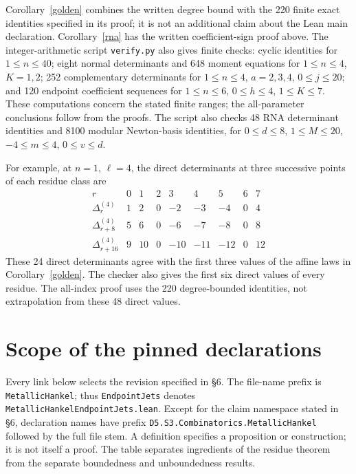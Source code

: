 \documentclass[11pt,a4paper]{article}
\newcommand{\D}[2]{\Delta_{#1}^{(#2)}}
\begin{document}
Corollary~\ref{golden} combines the written degree bound with the 220
finite exact identities specified in its proof; it is not an additional
claim about the Lean main declaration.
Corollary~\ref{rna} has the written coefficient-sign proof above.
The integer-arithmetic script \texttt{verify.py} also gives finite
checks: cyclic identities for $1\le n\le40$; eight normal determinants
and 648 moment equations for $1\le n\le4$, $K=1,2$; 252 complementary
determinants for $1\le n\le4$, $a=2,3,4$, $0\le j\le20$; and 120
endpoint coefficient sequences for $1\le n\le6$, $0\le h\le4$,
$1\le K\le7$. These computations concern the stated finite ranges;
the all-parameter conclusions follow from the proofs.
The script also checks 48 RNA determinant identities and 8100 modular
Newton-basis identities, for $0\le d\le8$, $1\le M\le20$,
$-4\le m\le4$, $0\le v\le d$.

For example, at $n=1$, $\ell=4$, the direct determinants at three
successive points of each residue class are
\[
\begin{array}{c|rrrrrrrr}
r&0&1&2&3&4&5&6&7\\\hline
\D r4&1&2&0&-2&-3&-4&0&4\\
\D{r+8}4&5&6&0&-6&-7&-8&0&8\\
\D{r+16}4&9&10&0&-10&-11&-12&0&12
\end{array}
\]
These 24 direct determinants agree with the first three values of the
affine laws in Corollary~\ref{golden}. The checker also gives the first
six direct values of every residue. The all-index proof uses the 220
degree-bounded identities, not extrapolation from these 48 direct values.

\appendix
\section{Scope of the pinned declarations}
Every link below selects the revision specified in \S6.
The file-name prefix is \texttt{MetallicHankel}; thus
\texttt{EndpointJets} denotes \texttt{MetallicHankelEndpointJets.lean}.
Except for the claim namespace stated in \S6, declaration names have
prefix \texttt{D5.S3.Combinatorics.MetallicHankel} followed by the
full file stem. A definition specifies a proposition or construction;
it is not itself a proof. The table separates ingredients of the residue
theorem from the separate boundedness and unboundedness results.
\end{document}
